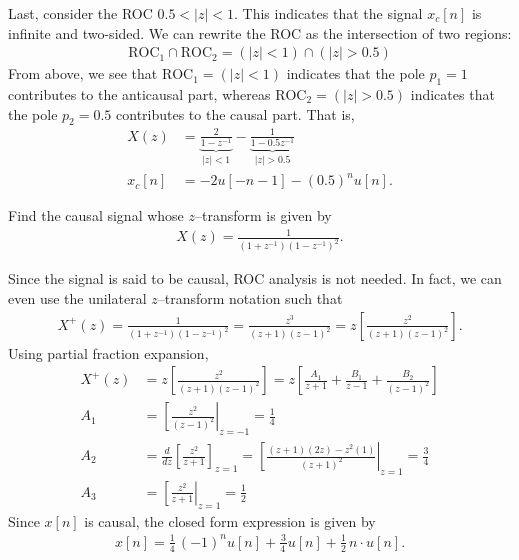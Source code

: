 \documentclass{report}
\begin{document}
\begin{solution}
    Last, consider the ROC $0.5<|z|<1$. This indicates that the signal $x_c[n]$ is infinite and two-sided. We can rewrite the ROC as the intersection of  
    two regions: 
    \begin{align*}
        \text{ROC}_1 \cap \text{ROC}_2 = (|z|<1) \cap (|z|>0.5)
    \end{align*}
    From above, we see that $\text{ROC}_1=(|z|<1)$ indicates that the pole $p_1=1$ contributes to the anticausal part, whereas 
    $\text{ROC}_2=(|z|>0.5)$ indicates that the pole $p_2=0.5$ contributes to the causal part. That is,
    \begin{align*}
        X(z) &= \underbrace{\frac{2}{1-z^{-1}}}_{|z|<1} - \underbrace{\frac{1}{1-0.5z^{-1}}}_{|z|>0.5} \\
        x_c[n] &= -2u[-n-1] - (0.5)^nu[n].
    \end{align*}
\end{solution}

\begin{example}
    Find the causal signal whose $z$--transform is given by 
    \begin{align*}
        X(z) = \frac{1}{(1+z^{-1})(1-z^{-1})^2}.
    \end{align*}
\end{example}
\begin{solution}
    Since the signal is said to be causal, ROC analysis is not needed. In fact, we can even use the unilateral $z$--transform notation such that 
    \begin{align*}
        X^+(z) = \frac{1}{(1+z^{-1})(1-z^{-1})^2} = \frac{z^3}{(z+1)(z-1)^2} = z\left[\frac{z^2}{(z+1)(z-1)^2}\right].
    \end{align*}
    Using partial fraction expansion,
    \begin{align*}
        X^+(z) &= z\left[\frac{z^2}{(z+1)(z-1)^2}\right] = z\left[\frac{A_1}{z+1} + \frac{B_1}{z-1} + \frac{B_2}{(z-1)^2}\right] \\
        A_1 &= \left[\frac{z^2}{(z-1)^2}\right|_{z=-1} = \frac{1}{4} \\ 
        A_2 &= \frac{d}{dz}\left[\frac{z^2}{z+1}\right]_{z=1} = \left[\frac{(z+1)(2z)-z^2(1)}{(z+1)^2}\right|_{z=1} = \frac{3}{4} \\
        A_3 &= \left[\frac{z^2}{z+1}\right|_{z=1} = \frac{1}{2}
    \end{align*}
    Since $x[n]$ is causal, the closed form expression is given by 
    \begin{align*}
        x[n] = \frac{1}{4}\,(-1)^n u[n] + \frac{3}{4\,}u[n] + \frac{1}{2}\,n\cdot u[n].
    \end{align*}
\end{solution}
\end{document}
